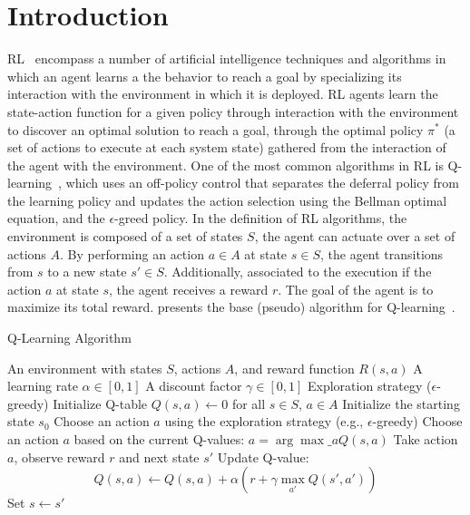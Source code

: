 
\section{Introduction}
\label{sec:problem}

\ac{RL}~\cite{sutton18} encompass a number of artificial intelligence techniques and algorithms in 
which an agent learns a the behavior to reach a goal by specializing its interaction with the 
environment in which it is deployed.
\ac{RL} agents learn the state-action function for a given policy through interaction with the 
environment to discover an optimal solution to reach a goal, through the optimal policy $\pi^*$ (a set 
of actions to execute at each system state) gathered from the interaction of the agent with the 
environment. One of the most common algorithms in \ac{RL} is Q-learning~\cite{beakcheol19}, which 
uses an off-policy control that separates the deferral policy from the learning policy and updates the 
action selection using the Bellman optimal equation, and the $\epsilon$-greed policy.  In the definition 
of \ac{RL} algorithms, the environment is composed of a set of states $S$, the agent can actuate over 
a set of actions $A$. By performing an action $a\in A$ at state $s \in S$, the agent transitions from $s$
to a new state $s' \in S$. Additionally, associated to the execution if the action $a$ at state $s$, the 
agent receives a reward $r$. The goal of the agent is to maximize its total reward.  
presents the base (pseudo) algorithm for Q-learning~\cite{sutton18}.

\begin{algorithm}
\caption{Q-Learning Algorithm}\label{lst:qlearning}
\begin{algorithmic}
\Require An environment with states $S$, actions $A$, and reward function $R(s, a)$
\Require A learning rate $\alpha \in [0, 1]$
\Require A discount factor $\gamma \in [0, 1]$
\Require Exploration strategy (\eg $\epsilon$-greedy)
\State Initialize Q-table $Q(s, a) \gets 0$ for all $s \in S$, $a \in A$
    \State Initialize the starting state $s_0$
            \State Choose an action $a$ using the exploration strategy (e.g., $\epsilon$-greedy)
        \Else
            \State Choose an action $a$ based on the current Q-values: $a = \arg\max\_a Q(s, a)$
        \EndIf
        \State Take action $a$, observe reward $r$ and next state $s'$
        \State Update Q-value: 
        \[
        Q(s, a) \gets Q(s, a) + \alpha \left( r + \gamma \max_{a'} Q(s', a')\right)
        \]
        \State Set $s \gets s'$
    \EndFor
\EndFor
\end{algorithmic}
\end{algorithm}

